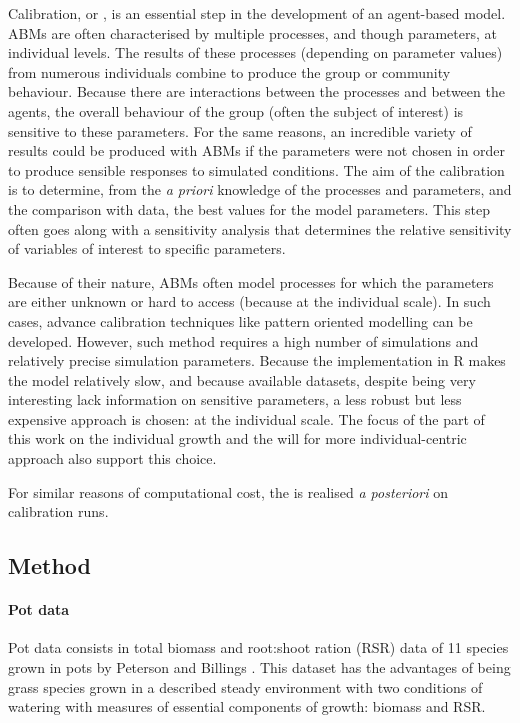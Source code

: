 Calibration, or , is an essential step in the development of an agent-based model. ABMs are often characterised by multiple processes, and though parameters, at individual levels. The results of these processes (depending on parameter values) from numerous individuals combine to produce the group or community behaviour. Because there are interactions between the processes and between the agents, the overall behaviour of the group (often the subject of interest) is sensitive to these parameters. For the same reasons, an incredible variety of results could be produced with ABMs if the parameters were not chosen in order to produce sensible responses to simulated conditions. The aim of the calibration is to determine, from the \textit{a priori} knowledge of the processes and parameters, and the comparison with data, the best values for the model parameters. This step often goes along with a sensitivity analysis that determines the relative sensitivity of variables of interest to specific parameters.

Because of their nature, ABMs often model processes for which the parameters are either unknown or hard to access (because at the individual scale). In such cases, advance calibration techniques like pattern oriented modelling\parencite{grimm_pattern-oriented_2005, hartig} can be developed. However, such method requires a high number of simulations and relatively precise simulation parameters. Because the implementation in R makes the model relatively slow, and because available datasets, despite being very interesting lack information on sensitive parameters, a less robust but less expensive approach is chosen:  at the individual scale. The focus of the part of this work on the individual growth and the will for more individual-centric approach also support this choice.

 For similar reasons of computational cost, the  is  realised \textit{a posteriori} on calibration runs.

\subsection{Method}

\paragraph{Pot data}
Pot data consists in total biomass and root:shoot ration (RSR) data of 11 species grown in pots by Peterson and Billings \parencite{peterson_growth_1982}. This dataset has the advantages of being grass species grown in a described steady environment with two conditions of watering with measures of essential components of growth: biomass and RSR.

